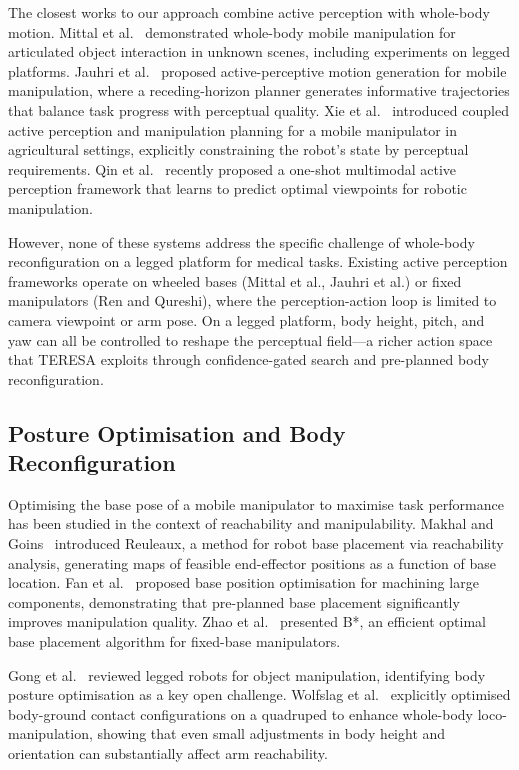 The closest works to our approach combine active perception with whole-body
motion. Mittal et al.~\cite{mittal2022} demonstrated whole-body mobile
manipulation for articulated object interaction in unknown scenes, including
experiments on legged platforms. Jauhri et al.~\cite{jauhri2024} proposed
active-perceptive motion generation for mobile manipulation, where a
receding-horizon planner generates informative trajectories that balance
task progress with perceptual quality. Xie et al.~\cite{xie2024capm}
introduced coupled active perception and manipulation planning for a mobile
manipulator in agricultural settings, explicitly constraining the robot's
state by perceptual requirements. Qin et al.~\cite{qin2026} recently proposed
a one-shot multimodal active perception framework that learns to predict
optimal viewpoints for robotic manipulation.

However, none of these systems address the specific challenge of whole-body
reconfiguration on a legged platform for medical tasks. Existing active
perception frameworks operate on wheeled bases (Mittal et al., Jauhri et al.)
or fixed manipulators (Ren and Qureshi), where the perception-action loop is
limited to camera viewpoint or arm pose. On a legged platform, body height,
pitch, and yaw can all be controlled to reshape the perceptual field---a
richer action space that \ac{TERESA} exploits through confidence-gated search
and pre-planned body reconfiguration.

\subsection{Posture Optimisation and Body Reconfiguration}

Optimising the base pose of a mobile manipulator to maximise task performance
has been studied in the context of reachability and manipulability. Makhal and
Goins~\cite{makhal2018} introduced Reuleaux, a method for robot base placement
via reachability analysis, generating maps of feasible end-effector positions
as a function of base location. Fan et al.~\cite{fan2021} proposed base
position optimisation for machining large components, demonstrating that
pre-planned base placement significantly improves manipulation quality. Zhao
et al.~\cite{zhao2025} presented B*, an efficient optimal base placement
algorithm for fixed-base manipulators.

Gong et al.~\cite{gong2023} reviewed legged robots for object manipulation,
identifying body posture optimisation as a key open challenge. Wolfslag et
al.~\cite{wolfslag2020} explicitly optimised body-ground contact configurations
on a quadruped to enhance whole-body loco-manipulation, showing that even small
adjustments in body height and orientation can substantially affect arm
reachability.

